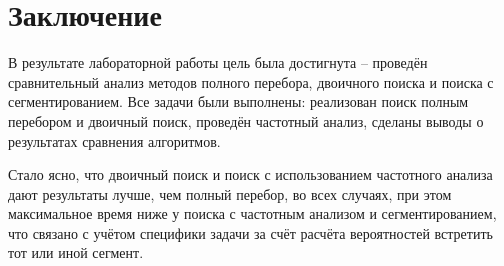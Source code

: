 \chapter*{Заключение}
\label{cha:conclusion}
В результате лабораторной работы цель была достигнута -- проведён сравнительный анализ методов полного перебора, двоичного поиска и поиска с сегментированием. Все задачи были выполнены: реализован поиск полным перебором и двоичный поиск, проведён частотный анализ, сделаны выводы о результатах сравнения алгоритмов.
\par Стало ясно, что двоичный поиск и поиск с использованием частотного анализа дают результаты лучше, чем полный перебор, во всех случаях, при этом максимальное время ниже у поиска с частотным анализом и сегментированием, что связано с учётом специфики задачи за счёт расчёта вероятностей встретить тот или иной сегмент.
